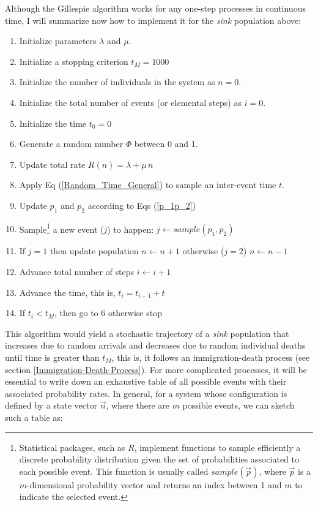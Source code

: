 \documentclass{article}
\begin{document}
Although the Gillespie algorithm works for any one-step processes in continuous time, I will summarize now how to implement it for the \textit{sink} population above:
\begin{enumerate}
	\item Initialize parameters $\lambda$ and $\mu$. 
	\item Initialize a stopping criterion $t_M = 1000$
	\item Initialize the number of individuals in the system as $n=0$.
	\item Initialize the total number of events (or elemental steps) as $i=0$.
	\item Initialize the time $t_0 = 0$
	\item Generate a random number $\Phi$ between 0 and 1.
	\item Update total rate $R(n) = \lambda + \mu\,n$ 
	\item Apply Eq (\ref{Random_Time_General}) to sample an inter-event time $t$.
	\item Update $p_1$ and $p_2$ according to Eqs (\ref{p_1p_2}) 
	\item Sample\footnote{Statistical packages, such as $R$, implement functions to sample efficiently a discrete probability distribution given the set of probabilities associated to each possible event. This function is usually called $sample(\vec{p})$, where $\vec{p}$ is a $m$-dimensional probability vector and returns an index between 1 and $m$ to indicate the selected event.} a new event ($j$) to happen: $j \leftarrow sample(p_1, p_2)$ 
	\item If $j=1$ then update population $n \leftarrow n+1$ otherwise ($j=2$) $n \leftarrow n-1$
	\item Advance total number of steps $i \leftarrow i + 1$
	\item Advance the time, this is, $t_i = t_{i-1} + t$
	\item If $t_i < t_M$, then go to 6 otherwise stop
\end{enumerate}
This algorithm would yield a stochastic trajectory of a \textit{sink} population that increases due to random arrivals and decreases due to random individual deaths until time is greater than $t_M$, this is, it follows an immigration-death process (see section \ref{Immigration-Death-Process}). For more complicated processes, it will be essential to write down an exhaustive table of all possible events with their associated probability rates. In general, for a system whose configuration is defined by a state vector $\vec{n}$, where there are $m$ possible events, we can sketch such a table as:
\end{document}
